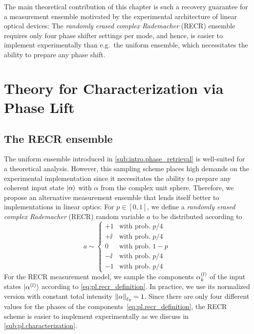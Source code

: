 The main theoretical contribution of this chapter is such a recovery guarantee for a measurement ensemble motivated by the experimental architecture of linear optical devices:
The \emph{randomly erased complex Rademacher} (RECR) ensemble requires only four phase shifter settings per mode, and hence, is easier to implement experimentally than e.g.\ the uniform ensemble, which necessitates the ability to prepare any phase shift.


\section{Theory for Characterization via Phase Lift}%
\label{sec:pl.theory}

\subsection{The RECR ensemble}%
\label{sub:pl.recr}

The uniform ensemble introduced in \cref{sub:intro.phase_retrieval} is well-suited for a theoretical analysis.
However, this sampling scheme places high demands on the experimental implementation since it necessitates the ability to prepare any coherent input state $\ket{\alpha}$ with $\alpha$ from the complex unit sphere.
Therefore, we propose an alternative measurement ensemble that lends itself better to implementations in linear optics:
For $p \in [0,1]$, we define a \emph{randomly erased complex Rademacher} (RECR) random variable $a$ to be distributed according to
\[
  a \sim
  \begin{cases}
    +1 & \textrm{with prob. } p/4 \\
    +\ii & \textrm{with prob. } p/4 \\
    0 & \textrm{with prob. } 1-p \\
    -\ii & \textrm{with prob. } p/4 \\
    -1 & \textrm{with prob. } p/4
  \end{cases}
  \label{eq:pl.recr_definition}
\]
For the RECR measurement model, we sample the components $\alpha^{(l)}_k$ of the input states $\ket{\alpha\ind{l}}$ according to \cref{eq:pl.recr_definition}.
In practice, we use its normalized version with constant total intensity ${\Vert\alpha\Vert}_{\ell_2} = 1$.
Since there are only four different values for the phases of the components~\eqref{eq:pl.recr_definition}, the RECR scheme is easier to implement experimentally as we discuss in \cref{sub:pl.characterization}.\\



